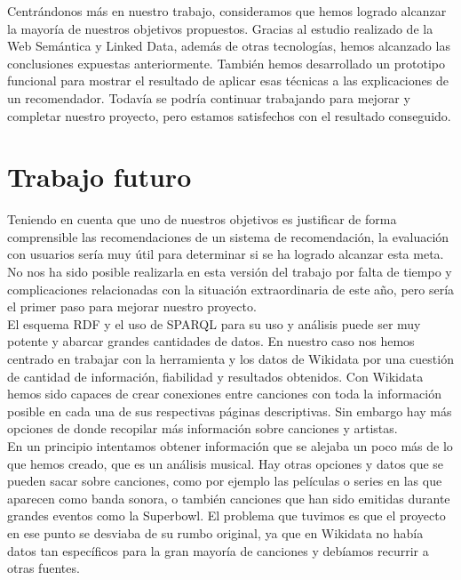 Centrándonos más en nuestro trabajo, consideramos que hemos logrado alcanzar la mayoría de nuestros objetivos propuestos. Gracias al estudio realizado de la Web Semántica y Linked Data, además de otras tecnologías, hemos alcanzado las conclusiones expuestas anteriormente. También hemos desarrollado un prototipo funcional para mostrar el resultado de aplicar esas técnicas a las explicaciones de un recomendador. Todavía se podría continuar trabajando para mejorar y completar nuestro proyecto, pero estamos satisfechos con el resultado conseguido.\\

\section{Trabajo futuro}

Teniendo en cuenta que uno de nuestros objetivos es justificar de forma comprensible las recomendaciones de un sistema de recomendación, la evaluación con usuarios sería muy útil para determinar si se ha logrado alcanzar esta meta. No nos ha sido posible realizarla en esta versión del trabajo por falta de tiempo y complicaciones relacionadas con la situación extraordinaria de este año, pero sería el primer paso para mejorar nuestro proyecto.\\

El esquema RDF y el uso de SPARQL para su uso y análisis puede ser muy potente y abarcar grandes cantidades de datos. En nuestro caso nos hemos centrado en trabajar con la herramienta y los datos de Wikidata por una cuestión de cantidad de información, fiabilidad y resultados obtenidos. Con Wikidata hemos sido capaces de crear conexiones entre canciones con toda la información posible en cada una de sus respectivas páginas descriptivas. Sin embargo hay más opciones de donde recopilar más información sobre canciones y artistas.\\ 

En un principio intentamos obtener información que se alejaba un poco más de lo que hemos creado, que es un análisis musical. Hay otras opciones y datos que se pueden sacar sobre canciones, como por ejemplo las películas o series en las que aparecen como banda sonora, o también canciones que han sido emitidas durante grandes eventos como la Superbowl. El problema que tuvimos es que el proyecto en ese punto se desviaba de su rumbo original, ya que en Wikidata no había datos tan específicos para la gran mayoría de canciones y debíamos recurrir a otras fuentes.\\


